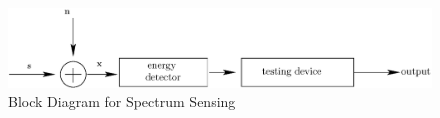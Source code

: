 \documentclass[12pt,journal,a4paper,twoside,onecolumn]{IEEEtran}
\begin{document}
\begin{spacing}{2}
\begin{figure}[!hbp]
\centering
\includegraphics[width = \textwidth]{4/fig4.eps}
\caption{Block Diagram for Spectrum Sensing}
\label{pic: block diagram}
\end{figure}

\end{spacing}
\end{document}
